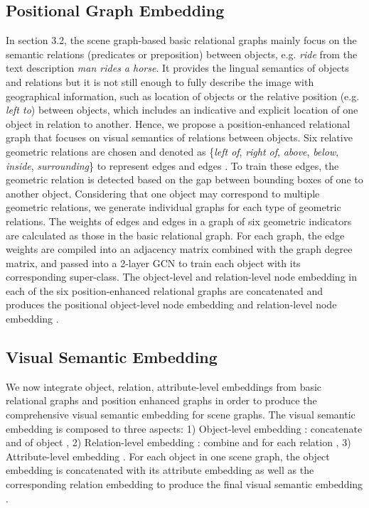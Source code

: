 \documentclass[11pt]{article}
\begin{document}
\subsection{Positional Graph Embedding}
In section 3.2, the scene graph-based basic relational graphs mainly focus on the semantic relations (predicates or preposition) between objects, e.g. \textit{ride} from the text description \textit{man rides a horse}. It provides the lingual semantics of objects and relations but it is not still enough to fully describe the image with geographical information, such as location of objects or the relative position (e.g. \textit{left to}) between objects, which includes an indicative and explicit location of one object in relation to another. Hence, we propose a position-enhanced relational graph  that focuses on visual semantics of relations between objects. Six relative geometric relations are chosen and denoted as   \{\textit{left of}, \textit{right of}, \textit{above}, \textit{below}, \textit{inside}, \textit{surrounding}\} to represent edges  and edges . To train these edges, the geometric relation is detected based on the gap between bounding boxes of one to another object. Considering that one object may correspond to multiple geometric relations, we generate individual graphs for each type of geometric relations. The weights of edges  and edges  in a graph  of six geometric indicators are calculated as those in the basic relational graph. For each graph, the edge weights are compiled into an adjacency matrix combined with the graph degree matrix, and passed into a 2-layer GCN to train each object with its corresponding super-class. The object-level and relation-level node embedding in each of the six position-enhanced relational graphs are concatenated and produces the positional object-level node embedding  and relation-level node embedding .



\subsection{Visual Semantic Embedding} 
We now integrate object, relation, attribute-level embeddings from basic relational graphs and position enhanced graphs in order to produce the comprehensive visual semantic embedding for scene graphs. The visual semantic embedding is composed to three aspects: 1) Object-level embedding : concatenate  and  of object , 2) Relation-level embedding : combine  and  for each relation , 3) Attribute-level embedding . For each object in one scene graph, the object embedding is concatenated with its attribute embedding as well as the corresponding relation embedding to produce the final visual semantic embedding .
\end{document}
